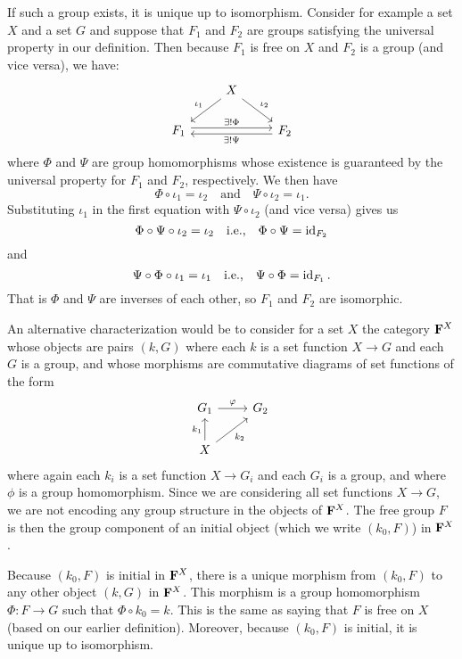 If such a group exists, it is unique up to isomorphism. Consider for example a
set \(X\) and a set \(G\) and suppose that \(F_1\) and \(F_2\) are groups
satisfying the universal property in our definition. Then because \(F_1\) is
free on \(X\) and \(F_2\) is a group (and vice versa), we have:
\[
    \begin{tikzcd}
        & X \arrow[dl, "\iota_1"'] \arrow[dr, "\iota_2"] & \\
        F_1 \arrow[rr, "\exists!\Phi", shift left] & & F_2 \arrow[ll, "\exists!\Psi", shift left]
    \end{tikzcd}
\]
where \(\Phi\) and \(\Psi\) are group homomorphisms whose existence is
guaranteed by the universal property for \(F_1\) and \(F_2\), respectively. We
then have
\[
    \Phi \circ \iota_1 = \iota_2 \quad \text{and} \quad \Psi \circ \iota_2 = \iota_1.
\]
Substituting \(\iota_1\) in the first equation with \(\Psi \circ \iota_2\) (and
vice versa) gives us
\[
    \Phi \circ \Psi \circ \iota_2 = \iota_2 \quad \text{i.e.,} \quad \Phi \circ \Psi = \operatorname{id}_{F_2}
\]
and
\[
    \Psi \circ \Phi \circ \iota_1 = \iota_1 \quad \text{i.e.,} \quad \Psi \circ \Phi = \operatorname{id}_{F_1}.
\]
That is \(\Phi\) and \(\Psi\) are inverses of each other, so \(F_1\) and \(F_2\)
are isomorphic.

An alternative characterization would be to consider for a set \(X\) the
category \(\mathbf{F}^X\) whose objects are pairs \((k, G)\) where each \(k\) is a
set function \(X \to G\) and each \(G\) is a group, and whose morphisms are
commutative diagrams of set functions of the form
\[
    \begin{tikzcd}
        G_1 \arrow[r, "\phi"]                 & G_2 \\
        X \arrow[u, "k_1"] \arrow[ru, "k_2"'] &    
    \end{tikzcd}
\]
where again each \(k_i\) is a set function \(X \to G_i\) and each \(G_i\) is a
group, and where \(\phi\) is a group homomorphism. Since we are considering all
set functions \(X \to G\), we are not encoding any group structure in the
objects of \(\mathbf{F}^X\). The free group \(F\) is then the group component of
an initial object (which we write \((k_0, F)\)) in \(\mathbf{F}^X\).

Because \((k_0, F)\) is initial in \(\mathbf{F}^X\), there is a unique morphism
from \((k_0, F)\) to any other object \((k, G)\) in \(\mathbf{F}^X\). This
morphism is a group homomorphism \(\Phi: F \to G\) such that \(\Phi \circ k_0 =
k\). This is the same as saying that \(F\) is free on \(X\) (based on our
earlier definition). Moreover, because \((k_0, F)\) is initial, it is unique up
to isomorphism.

